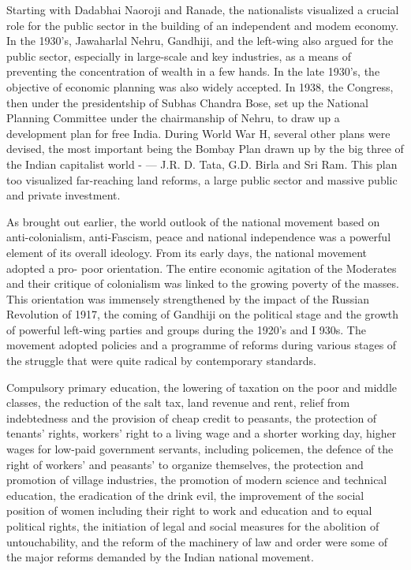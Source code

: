\begin{multicols}{2}
Starting with Dadabhai Naoroji and Ranade, the nationalists visualized a crucial role for the public sector in the building of an independent and modem economy. In the 1930's, Jawaharlal Nehru, Gandhiji, and the left-wing also argued for the public sector, especially in large-scale and key industries, as a means of preventing the concentration of wealth in a few hands. In the late 1930's, the objective of economic planning was also widely accepted. In 1938, the Congress, then under the presidentship of Subhas Chandra Bose, set up the National Planning Committee under the chairmanship of Nehru, to draw up a development plan for free India. During World War H, several other plans were devised, the most important being the Bombay Plan drawn up by the big three of the Indian capitalist world - --- J.R. D. Tata, G.D. Birla and Sri Ram. This plan too visualized far-reaching land reforms, a large public sector and massive public and private investment.

As brought out earlier, the world outlook of the national movement based on anti-colonialism, anti-Fascism, peace and national independence was a powerful element of its overall ideology. From its early days, the national movement adopted a pro- poor orientation. The entire economic agitation of the Moderates and their critique of colonialism was linked to the growing poverty of the masses. This orientation was immensely strengthened by the impact of the Russian Revolution of 1917, the coming of Gandhiji on the political stage and the growth of powerful left-wing parties and groups during the 1920's and I 930s. The movement adopted policies and a programme of reforms during various stages of the struggle that were quite radical by contemporary standards.

Compulsory primary education, the lowering of taxation on the poor and middle classes, the reduction of the salt tax, land revenue and rent, relief from indebtedness and the provision of cheap credit to peasants, the protection of tenants' rights, workers' right to a living wage and a shorter working day, higher wages for low-paid government servants, including policemen, the defence of the right of workers' and peasants' to organize themselves, the protection and promotion of village industries, the promotion of modern science and technical education, the eradication of the drink evil, the improvement of the social position of women including their right to work and education and to equal political rights, the initiation of legal and social measures for the abolition of untouchability, and the reform of the machinery of law and order were some of the major reforms demanded by the Indian national movement.


\end{multicols}
